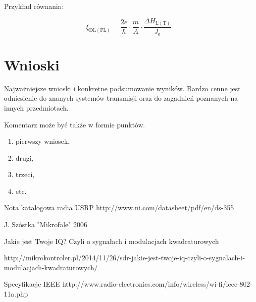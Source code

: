 \documentclass{article}
\begin{document}
Przykład równania:

\begin{equation}
\xi_\mathrm{DL(FL)} = {\dfrac{2e}{\hbar}}\cdot {\dfrac{m}{A}}\cdot {\dfrac{\Delta H_\mathrm{L(T)}}{J_\mathrm{e}}}
\label{eq:efficiency}
\end{equation} \newpage



\section{Wnioski}

Najważniejsze wnioski i konkretne podsumowanie wyników. Bardzo cenne jest odniesienie do znanych systemów transmisji oraz do zagadnień poznanych na innych przedmiotach. \newline

Komentarz może być także w formie punktów.
\begin{enumerate}
\item pierwszy wniosek,
\item drugi,
\item trzeci,
\item etc.
\end{enumerate}



\begin{thebibliography}{10}

Nota katalogowa radia USRP \newline 
http://www.ni.com/datasheet/pdf/en/ds-355

J. Szóstka "Mikrofale" 2006

Jakie jest Twoje IQ? Czyli o sygnałach i modulacjach kwadraturowych

http://mikrokontroler.pl/2014/11/26/sdr-jakie-jest-twoje-iq-czyli-o-sygnalach-i-modulacjach-kwadraturowych/

Specyfikacje IEEE \newline http://www.radio-electronics.com/info/wireless/wi-fi/ieee-802-11a.php


\end{thebibliography}
\end{document}
